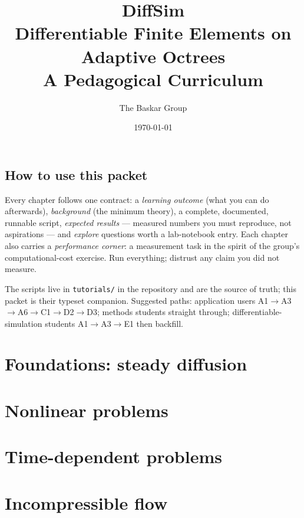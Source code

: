 \documentclass[11pt,a4paper,oneside]{report}
\title{\Huge\textbf{DiffSim}\\[0.5em]
       \Large Differentiable Finite Elements on Adaptive Octrees\\[0.25em]
       \large A Pedagogical Curriculum}
\author{The Baskar Group}
\date{\today}
\begin{document}
\maketitle

\chapter*{How to use this packet}
Every chapter follows one contract: a \emph{learning outcome} (what you can
do afterwards), \emph{background} (the minimum theory), a complete,
documented, runnable script, \emph{expected results} --- measured numbers
you must reproduce, not aspirations --- and \emph{explore} questions worth
a lab-notebook entry. Each chapter also carries a \emph{performance
corner}: a measurement task in the spirit of the group's computational-cost
exercise. Run everything; distrust any claim you did not measure.

The scripts live in \texttt{tutorials/} in the repository and are the
source of truth; this packet is their typeset companion. Suggested paths:
application users A1$\to$A3$\to$A6$\to$C1$\to$D2$\to$D3; methods students
straight through; differentiable-simulation students
A1$\to$A3$\to$E1 then backfill.

\tableofcontents

\part{Foundations: steady diffusion}







\part{Nonlinear problems}



\part{Time-dependent problems}



\part{Incompressible flow}



\end{document}
